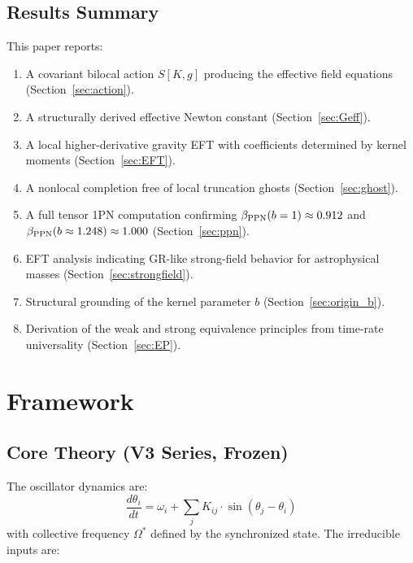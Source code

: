 \documentclass[12pt]{article}
\begin{document}
\subsection{Results Summary}

This paper reports:
\begin{enumerate}
\item A covariant bilocal action $S[K,g]$ producing the effective field equations (Section~\ref{sec:action}).
\item A structurally derived effective Newton constant (Section~\ref{sec:Geff}).
\item A local higher-derivative gravity EFT with coefficients determined by kernel moments (Section~\ref{sec:EFT}).
\item A nonlocal completion free of local truncation ghosts (Section~\ref{sec:ghost}).
\item A full tensor 1PN computation confirming $\beta_{\rm PPN}(b=1)\approx 0.912$ and $\beta_{\rm PPN}(b\approx 1.248)\approx 1.000$ (Section~\ref{sec:ppn}).
\item EFT analysis indicating GR-like strong-field behavior for astrophysical masses (Section~\ref{sec:strongfield}).
\item Structural grounding of the kernel parameter $b$ (Section~\ref{sec:origin_b}).
\item Derivation of the weak and strong equivalence principles from time-rate universality (Section~\ref{sec:EP}).
\end{enumerate}

\section{Framework}
\label{sec:framework}

\subsection{Core Theory (V3 Series, Frozen)}

The oscillator dynamics are:
\begin{equation}
\frac{d\theta_i}{dt} = \omega_i + \sum_j K_{ij} \cdot \sin(\theta_j - \theta_i)
\label{eq:oscillator}
\end{equation}
with collective frequency $\Omega^*$ defined by the synchronized state. The irreducible inputs are:
\end{document}
